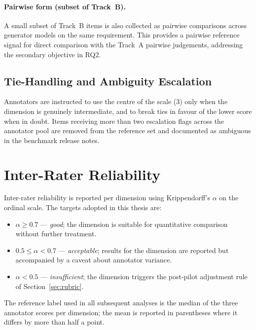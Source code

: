 \paragraph{Pairwise form (subset of Track~B).}
A small subset of Track~B items is also collected as pairwise
comparisons across generator models on the same requirement. This
provides a pairwise reference signal for direct comparison with the
Track~A pairwise judgements, addressing the secondary objective in
RQ2.

\subsection{Tie-Handling and Ambiguity Escalation}

Annotators are instructed to use the centre of the scale (3) only when
the dimension is genuinely intermediate, and to break ties in favour of
the lower score when in doubt. Items receiving more than two escalation
flags across the annotator pool are removed from the reference set and
documented as ambiguous in the benchmark release notes.

\section{Inter-Rater Reliability}
\label{sec:irr}

Inter-rater reliability is reported per dimension using Krippendorff's
$\alpha$ on the ordinal scale. The targets adopted in this thesis are:

\begin{itemize}
  \item $\alpha \geq 0.7$ — \emph{good}; the dimension is suitable for
    quantitative comparison without further treatment.
  \item $0.5 \leq \alpha < 0.7$ — \emph{acceptable}; results for the
    dimension are reported but accompanied by a caveat about
    annotator variance.
  \item $\alpha < 0.5$ — \emph{insufficient}; the dimension triggers
    the post-pilot adjustment rule of Section~\ref{sec:rubric}.
\end{itemize}

The reference label used in all subsequent analyses is the median of
the three annotator scores per dimension; the mean is reported in
parentheses where it differs by more than half a point.


